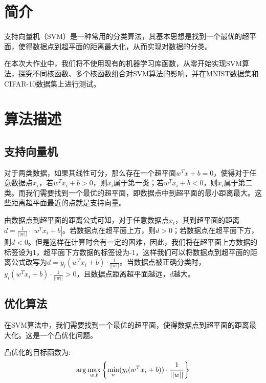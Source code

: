 \documentclass[a4paper]{article}
\begin{document}



\section{简介}
支持向量机（SVM）是一种常用的分类算法，其基本思想是找到一个最优的超平面，使得数据点到超平面的距离最大化，从而实现对数据的分类。

在本次大作业中，我们将不使用现有的机器学习库函数，从零开始实现SVM算法，探究不同核函数、多个核函数组合对SVM算法的影响，并在MNIST数据集和CIFAR-10数据集上进行测试。

\section{算法描述}
\subsection{支持向量机}
对于两类数据，如果其线性可分，那么存在一个超平面$w^Tx+b=0$，使得对于任意数据点$x_i$，若$w^Tx_i+b>0$，则$x_i$属于第一类；若$w^Tx_i+b<0$，则$x_i$属于第二类。而我们需要找到一个最优的超平面，即数据点中到超平面的最小距离最大。这些距离超平面最近的点就是支持向量。

由数据点到超平面的距离公式可知，对于任意数据点$x_i$，其到超平面的距离$d=\frac{1}{||w||}\cdot |w^Tx_i+b|$。若数据点在超平面上方，则$d>0$；若数据点在超平面下方，则$d<0$。但是这样在计算时会有一定的困难，因此，我们将在超平面上方数据的标签设为1，超平面下方数据的标签设为-1，这样我们可以将数据点到超平面的距离公式改写为$d=y_i(w^Tx_i+b)\cdot\frac{1}{||w||}$。当数据点被正确分类时，$y_i(w^Tx_i+b)\cdot\frac{1}{||w||}>0$，且数据点距离超平面越远，$d$越大。

\subsection{优化算法}
在SVM算法中，我们需要找到一个最优的超平面，使得数据点到超平面的距离最大化。这是一个凸优化问题。

凸优化的目标函数为:
\begin{gather}
\arg\max_{w, b}\left\{\min_n(y_i(w^T x_i+b))\cdot\frac{1}{||w||}\right\} \notag
\end{gather}
\end{document}

